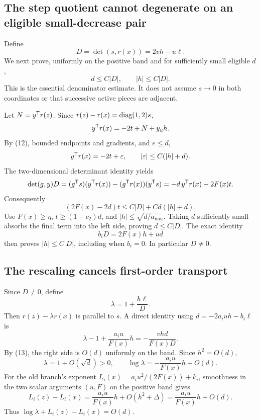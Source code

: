 \documentclass[10pt,oneside,openany]{book}
\theoremstyle{remark}\newtheorem{remark}{Remark}[chapter]
\begin{document}
\subsection{The step quotient cannot degenerate on an eligible small-decrease pair}
Define
\[
 D=\det(s,r(x))=2vh-u\ell.
\]
We next prove, uniformly on the positive band and for sufficiently small eligible $d$,
\begin{equation}
 d\le C|D|,\qquad |h|\le C|D|. \tag{Q.13}
\end{equation}
This is the essential denominator estimate. It does not assume $s\to0$ in both coordinates or that successive active pieces are adjacent.

Let $N=y^{\mathsf T} r(z)$. Since $r(z)-r(x)=\operatorname{diag}(1,2)s$,
\[
 y^{\mathsf T} r(x)=-2t+N+y_u h.
\]
By (12), bounded endpoints and gradients, and $e\le d$,
\[
 y^{\mathsf T} r(x)=-2t+\varepsilon,\qquad |\varepsilon|\le C(|h|+d).
\]
The two-dimensional determinant identity yields
\[
 \det(g,y)D=(g^{\mathsf T} s)(y^{\mathsf T} r(x))-(g^{\mathsf T} r(x))(y^{\mathsf T} s)
 =-d\,y^{\mathsf T} r(x)-2F(x)t.
\]
Consequently
\[
 (2F(x)-2d)t\le C|D|+Cd(|h|+d).
\]
Use $F(x)\ge\eta$, $t\ge(1-c_2)d$, and $|h|\le\sqrt{d/a_{\min}}$. Taking $d$ sufficiently small absorbs the final term into the left side, proving $d\le C|D|$. The exact identity
\begin{equation}
 b_iD=2F(x)h+ud \tag{Q.14}
\end{equation}
then proves $|h|\le C|D|$, including when $b_i=0$. In particular $D\ne0$.

\subsection{The rescaling cancels first-order transport}
Since $D\ne0$, define
\[
 \lambda=1+\frac{h\ell}{D}.
\]
Then $r(z)-\lambda r(x)$ is parallel to $s$. A direct identity using $d=-2a_iuh-b_i\ell$ is
\begin{equation}
 \lambda-1+\frac{a_i u}{F(x)}h
 =-\frac{vhd}{F(x)D}. \tag{Q.15}
\end{equation}
By (13), the right side is $O(d)$ uniformly on the band. Since $h^2=O(d)$,
\[
 \lambda=1+O(\sqrt d)>0,\qquad
 \log\lambda=-\frac{a_i u}{F(x)}h+O(d).
\]
For the old branch's exponent $L_i(x)=a_i u^2/(2F(x))+k_i$, smoothness in the two scalar arguments $(u,F)$ on the positive band gives
\[
 L_i(z)-L_i(x)=\frac{a_i u}{F(x)}h+O(h^2+\Delta)
 =\frac{a_i u}{F(x)}h+O(d).
\]
Thus $\log\lambda+L_i(z)-L_i(x)=O(d)$.
\end{document}
